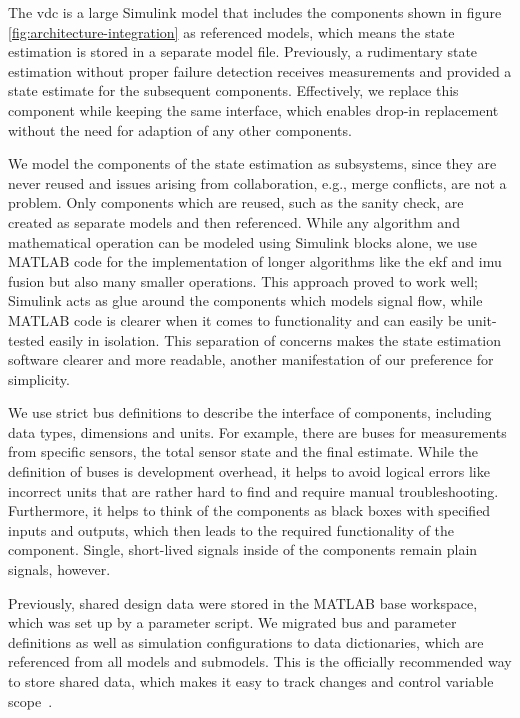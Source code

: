 The \gls{vdc} is a large Simulink model that includes the components shown in figure \ref{fig:architecture-integration} as referenced models, which means the state estimation is stored in a separate model file. Previously, a rudimentary state estimation without proper failure detection receives measurements and provided a state estimate for the subsequent components. Effectively, we replace this component while keeping the same interface, which enables drop-in replacement without the need for adaption of any other components.

We model the components of the state estimation as subsystems, since they are never reused and issues arising from collaboration, e.g., merge conflicts, are not a problem. Only components which are reused, such as the sanity check, are created as separate models and then referenced. While any algorithm and mathematical operation can be modeled using Simulink blocks alone, we use MATLAB code for the implementation of longer algorithms like the \gls{ekf} and \gls{imu} fusion but also many smaller operations. This approach proved to work well; Simulink acts as glue around the components which models signal flow, while MATLAB code is clearer when it comes to functionality and can easily be unit-tested easily in isolation. This separation of concerns makes the state estimation software clearer and more readable, another manifestation of our preference for simplicity.

We use strict bus definitions to describe the interface of components, including data types, dimensions and units. For example, there are buses for measurements from specific sensors, the total sensor state and the final estimate. While the definition of buses is development overhead, it helps to avoid logical errors like incorrect units that are rather hard to find and require manual troubleshooting. Furthermore, it helps to think of the components as black boxes with specified inputs and outputs, which then leads to the required functionality of the component. Single, short-lived signals inside of the components remain plain signals, however.

Previously, shared design data were stored in the MATLAB base workspace, which was set up by a parameter script. We migrated bus and parameter definitions as well as simulation configurations to data dictionaries, which are referenced from all models and submodels. This is the officially recommended way to store shared data, which makes it easy to track changes and control variable scope~\cite{TheMathWorksInc..2020b}.


